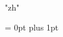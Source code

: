 \usepackage{fontspec}
\usepackage{xeCJK}

\setmainfont{Calibri}


\XeTeXlinebreaklocale "zh"

\XeTeXlinebreakskip = 0pt plus 1pt

\setlength{\parskip}{0.07cm}

\linespread{1}\selectfont